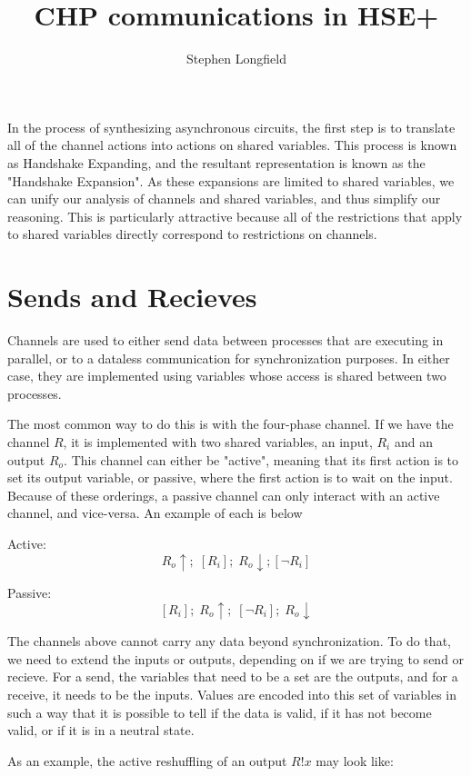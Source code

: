 \documentclass[times, 10pt]{article}
\title{CHP communications in HSE+}
\author{Stephen Longfield}
\begin{document}
\maketitle

In the process of synthesizing asynchronous circuits, the first step is to translate all of the channel actions into actions on shared variables.  This process is known as Handshake Expanding, and the resultant representation is known as the "Handshake Expansion". As these expansions are limited to shared variables, we can unify our analysis of channels and shared variables, and thus simplify our reasoning.  This is particularly attractive because all of the restrictions that apply to shared variables directly correspond to restrictions on channels.

\section{Sends and Recieves}

Channels are used to either send data between processes that are executing in parallel, or to a dataless communication for synchronization purposes. In either case, they are implemented using variables whose access is shared between two processes. 

The most common way to do this is with the four-phase channel.  If we have the channel $R$, it is implemented with two shared variables, an input, $R_i$ and an output $R_o$.  This channel can either be "active", meaning that its first action is to set its output variable, or passive, where the first action is to wait on the input.  Because of these orderings, a passive channel can only interact with an active channel, and vice-versa. An example of each is below

Active:
\[
R_o\!\uparrow;\; [R_i];\; R_o\!\downarrow; [\lnot R_i]
\]

Passive:
\[
[R_i]; \; R_o\!\uparrow;\; [\lnot R_i];\; R_o\!\downarrow
\]

The channels above cannot carry any data beyond synchronization.  To do that, we need to extend the inputs or outputs, depending on if we are trying to send or recieve.  For a send, the variables that need to be a set are the outputs, and for a receive, it needs to be the inputs. Values are encoded into this set of variables in such a way that it is possible to tell if the data is valid, if it has not become valid, or if it is in a neutral state.

As an example, the active reshuffling of an output $R!x$ may look like:
\end{document}
